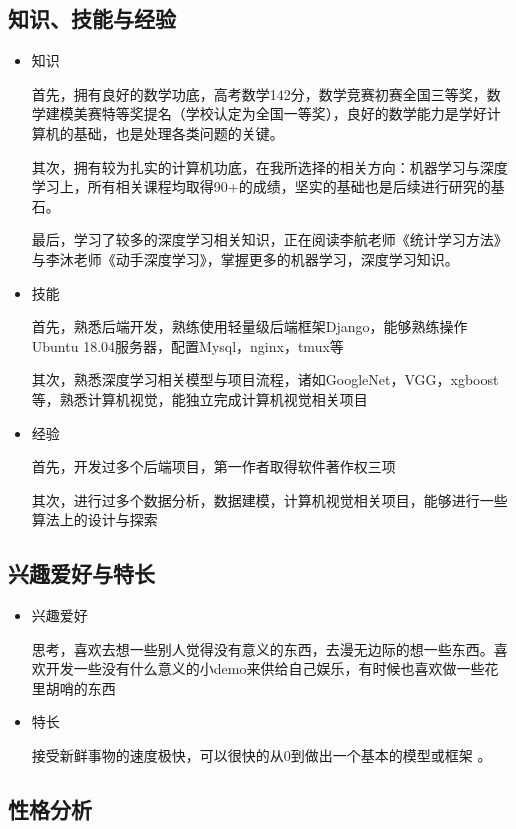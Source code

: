 \documentclass{article}
\begin{document}
\subsection{知识、技能与经验}
\begin{itemize}
\item 知识\par
首先，拥有良好的数学功底，高考数学142分，数学竞赛初赛全国三等奖，数学建模美赛特等奖提名（学校认定为全国一等奖），良好的数学能力是学好计算机的基础，也是处理各类问题的关键。\par
其次，拥有较为扎实的计算机功底，在我所选择的相关方向：机器学习与深度学习上，所有相关课程均取得90+的成绩，坚实的基础也是后续进行研究的基石。\par
最后，学习了较多的深度学习相关知识，正在阅读李航老师《统计学习方法》与李沐老师《动手深度学习》，掌握更多的机器学习，深度学习知识。
\item 技能\par
首先，熟悉后端开发，熟练使用轻量级后端框架Django，能够熟练操作Ubuntu 18.04服务器，配置Mysql，nginx，tmux等\par
其次，熟悉深度学习相关模型与项目流程，诸如GoogleNet，VGG，xgboost等，熟悉计算机视觉，能独立完成计算机视觉相关项目
\item 经验\par
首先，开发过多个后端项目，第一作者取得软件著作权三项\par
其次，进行过多个数据分析，数据建模，计算机视觉相关项目，能够进行一些算法上的设计与探索
\end{itemize}
\par
\subsection{兴趣爱好与特长}
\begin{itemize}


\item 兴趣爱好\par
思考，喜欢去想一些别人觉得没有意义的东西，去漫无边际的想一些东西。喜欢开发一些没有什么意义的小demo来供给自己娱乐，有时候也喜欢做一些花里胡哨的东西
\item 特长\par
接受新鲜事物的速度极快，可以很快的从0到做出一个基本的模型或框架
。

\end{itemize}
\subsection{性格分析}
\begin{itemize}
\end{itemize}
\par
\end{document}
